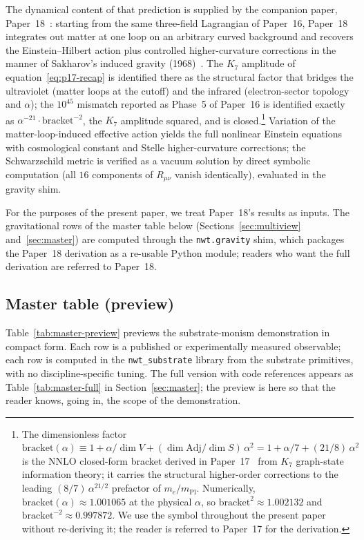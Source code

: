 \documentclass[11pt]{article}
\newcommand{\Adj}{\mathrm{Adj}}
\newcommand{\mPl}{m_{\mathrm{Pl}}}
\newcommand{\me}{m_e}
\newcommand{\nwtsub}{\texttt{nwt\_substrate}}
\begin{document}
The dynamical content of that prediction is supplied by the
companion paper, Paper~18~\cite{paper18}: starting from the same
three-field Lagrangian of Paper~16, Paper~18 integrates out matter
at one loop on an arbitrary curved background and recovers the
Einstein--Hilbert action plus controlled higher-curvature
corrections in the manner of Sakharov's induced gravity
(1968)~\cite{sakharov1968}.  The $K_7$ amplitude of
equation~\eqref{eq:p17-recap} is identified there as the structural
factor that bridges the ultraviolet (matter loops at the cutoff)
and the infrared (electron-sector topology and $\alpha$); the
$10^{45}$ mismatch reported as Phase~5 of Paper~16 is identified
exactly as $\alpha^{-21}\cdot \mathrm{bracket}^{-2}$, the $K_7$
amplitude squared, and is closed.\footnote{The dimensionless
factor $\mathrm{bracket}(\alpha) \equiv 1 + \alpha/\dim V +
(\dim\Adj/\dim S)\,\alpha^2 = 1 + \alpha/7 + (21/8)\,\alpha^2$
is the NNLO closed-form bracket derived in
Paper~17~\cite{paper17} from $K_7$ graph-state information
theory; it carries the structural higher-order corrections to
the leading $(8/7)\,\alpha^{21/2}$ prefactor of $\me/\mPl$.
Numerically, $\mathrm{bracket}(\alpha) \approx 1.001065$ at the
physical $\alpha$, so $\mathrm{bracket}^2 \approx 1.002132$ and
$\mathrm{bracket}^{-2} \approx 0.997872$.  We use the symbol
throughout the present paper without re-deriving it; the reader
is referred to Paper~17 for the derivation.}  Variation of the
matter-loop-induced effective action yields the full nonlinear
Einstein equations with cosmological constant and Stelle
higher-curvature corrections; the Schwarzschild metric is verified
as a vacuum solution by direct symbolic computation (all $16$
components of $R_{\mu\nu}$ vanish identically), evaluated in the
gravity shim.

For the purposes of the present paper, we treat Paper~18's results
as inputs.  The gravitational rows of the master table below
(Sections~\ref{sec:multiview} and~\ref{sec:master}) are computed
through the \texttt{nwt.gravity} shim, which packages the Paper~18
derivation as a re-usable Python module; readers who want the full
derivation are referred to Paper~18.

\subsection{Master table (preview)}

Table~\ref{tab:master-preview} previews the substrate-monism
demonstration in compact form.  Each row is a published or
experimentally measured observable; each row is computed in the
\nwtsub{} library from the substrate primitives, with no
discipline-specific tuning.  The full version with code references
appears as Table~\ref{tab:master-full} in
Section~\ref{sec:master}; the preview is here so that the reader
knows, going in, the scope of the demonstration.
\end{document}
